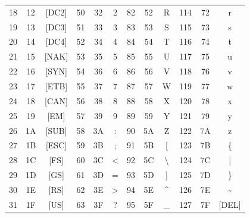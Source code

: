 \documentclass[12pt]{article}
\begin{document}
\begin{table}[H]
{\begin{tabular}{| c | c | c | c | c | c | c | c | c | c | c | c |}
    18 & 12 & [DC2] & 50 & 32 & 2 & 82 & 52 & R & 114 & 72 & r \\
    19 & 13 & [DC3] & 51 & 33 & 3 & 83 & 53 & S & 115 & 73 & s \\
    20 & 14 & [DC4] & 52 & 34 & 4 & 84 & 54 & T & 116 & 74 & t \\
    21 & 15 & [NAK] & 53 & 35 & 5 & 85 & 55 & U & 117 & 75 & u \\
    22 & 16 & [SYN] & 54 & 36 & 6 & 86 & 56 & V & 118 & 76 & v \\
    23 & 17 & [ETB] & 55 & 37 & 7 & 87 & 57 & W & 119 & 77 & w \\
    24 & 18 & [CAN] & 56 & 38 & 8 & 88 & 58 & X & 120 & 78 & x \\
    25 & 19 & [EM] & 57 & 39 & 9 & 89 & 59 & Y & 121 & 79 & y \\
    26 & 1A & [SUB] & 58 & 3A & : & 90 & 5A & Z & 122 & 7A & z \\
    27 & 1B & [ESC] & 59 & 3B & ; & 91 & 5B & [ & 123 & 7B & \{ \\
    28 & 1C & [FS] & 60 & 3C & < & 92 & 5C & \textbackslash & 124 & 7C & | \\
    29 & 1D & [GS] & 61 & 3D & = & 93 & 5D & ] & 125 & 7D & \} \\
    30 & 1E & [RS] & 62 & 3E & > & 94 & 5E & \textasciicircum & 126 & 7E & \textasciitilde \\
    31 & 1F & [US] & 63 & 3F & ? & 95 & 5F & \_ & 127 & 7F & [DEL] \\
    \hline
    \end{tabular}
}
\end{table}
\end{document}
